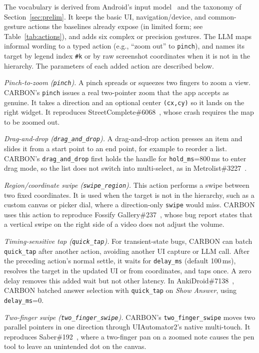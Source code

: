 \documentclass[10pt,conference,a4paper]{IEEEtran}
\begin{document}
The vocabulary is derived from Android's input model~\cite{androidmotion} and the taxonomy of Section~\ref{sec:prelim}. It keeps the basic UI, navigation/device, and common-gesture actions the baselines already expose (in limited form; see Table~\ref{tab:actions}), and adds six complex or precision gestures. The LLM maps informal wording to a typed action (e.g., ``zoom out'' to \texttt{pinch}), and names its target by legend index \texttt{\#k} or by raw screenshot coordinates when it is not in the hierarchy. The parameters of each added action are described below.


  \emph{Pinch-to-zoom (\texttt{pinch}).} A pinch spreads or squeezes two
  fingers to zoom a view. CARBON's \texttt{pinch} issues a real
  two-pointer zoom that the app accepts as genuine. It takes a direction
  and an optional center \texttt{(cx,cy)} so it lands on the right widget.
  It reproduces StreetComplete\#6068~\cite{streetcomplete6068}, whose crash
  requires the map to be zoomed out.

  \emph{Drag-and-drop (\texttt{drag\_and\_drop}).} A drag-and-drop action presses
  an item and slides it from a start point to an end point, for example to
  reorder a list. CARBON's \texttt{drag\_and\_drop} first holds the handle
  for \texttt{hold\_ms}=800\,ms to enter drag mode, so the list does not
  switch into multi-select, as in Metrolist\#3227~\cite{metrolist3227}.

  \emph{Region/coordinate swipe (\texttt{swipe\_region}).}
  This action performs a swipe between two fixed coordinates. It is
  used when the target is not in the hierarchy, such as a custom canvas or
  picker dial, where a direction-only \texttt{swipe} would miss. CARBON
  uses this action to reproduce Fossify Gallery\#237~\cite{gallery237},
  whose bug report states that a vertical swipe on the right side of a
  video does not adjust the volume.

  \emph{Timing-sensitive tap (\texttt{quick\_tap}).} For transient-state
  bugs, CARBON can batch \texttt{quick\_tap} after another action, avoiding
  another UI capture or LLM call. After the preceding action's normal settle,
  it waits for \texttt{delay\_ms} (default 100\,ms), resolves the target in
  the updated UI or from coordinates, and taps once. A zero delay removes
  this added wait but not other latency. In AnkiDroid\#7138~\cite{anki7138},
  CARBON batched answer selection with \texttt{quick\_tap} on
  \emph{Show Answer}, using \texttt{delay\_ms}=0.

  \emph{Two-finger swipe (\texttt{two\_finger\_swipe}).} CARBON's
  \texttt{two\_finger\_swipe} moves two parallel pointers in one direction
  through UIAutomator2's native multi-touch. It reproduces
  Saber\#192~\cite{saber192}, where a two-finger pan on a zoomed
  note causes the pen tool to leave an unintended dot on the canvas.
\end{document}
